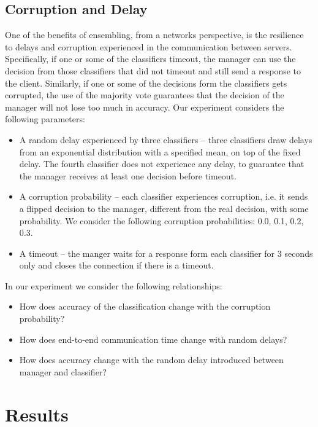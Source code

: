 \documentclass[11pt]{article}
\begin{document}
\subsection{Corruption and Delay}

One of the benefits of ensembling, from a networks perspective, is the resilience to delays and corruption experienced in the communication between servers. Specifically, if one or some of the classifiers timeout, the manager can use the decision from those classifiers that did not timeout and still send a response to the client. Similarly, if one or some of the decisions form the classifiers gets corrupted, the use of the majority vote guarantees that the decision of the manager will not lose too much in accuracy. Our experiment considers the following parameters:
\begin{itemize}
	\item A random delay experienced by three classifiers – three classifiers draw delays from an exponential distribution with a specified mean, on top of the fixed delay. The fourth classifier does not experience any delay, to guarantee that the manager receives at least one decision before timeout. 
	\item A corruption probability – each classifier experiences corruption, i.e. it sends a flipped decision to the manager, different from the real decision, with some probability. We consider the following corruption probabilities: 0.0, 0.1, 0.2, 0.3. 
	\item A timeout – the manger waits for a response form each classifier for 3 seconds only and closes the connection if there is a timeout. 
\end{itemize}
In our experiment we consider the following relationships:

\begin{itemize}
	\item How does accuracy of the classification change with the corruption probability?
	\item How does end-to-end communication time change with random delays?
	\item  How does accuracy change with the random delay introduced  between manager and classifier?
\end{itemize}



\section{Results}
\end{document}
